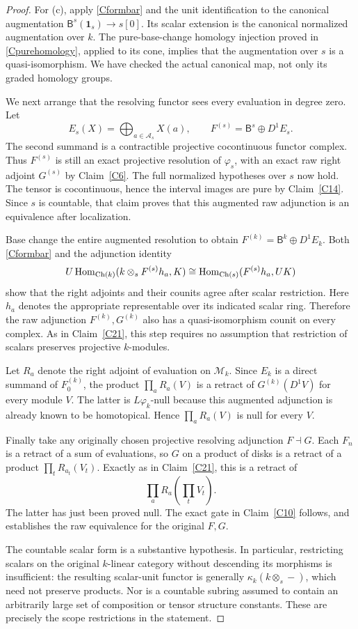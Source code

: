 \begin{proof}
For (c), apply \eqref{Cformbar} and the unit identification to the canonical augmentation $\mathsf B^s(\mathbf1_s)\to s[0]$. Its scalar extension is the canonical normalized augmentation over $k$. The pure-base-change homology injection proved in \eqref{Cpurehomology}, applied to its cone, implies that the augmentation over $s$ is a quasi-isomorphism. We have checked the actual canonical map, not only its graded homology groups.

We next arrange that the resolving functor sees every evaluation in degree zero. Let
\[
 E_s(X)=\bigoplus_{a\in\mathcal A_s}X(a),
 \qquad
 F^{(s)}=\mathsf B^s\oplus D^1E_s.
\]
The second summand is a contractible projective cocontinuous functor complex. Thus $F^{(s)}$ is still an exact projective resolution of $\varphi_s$, with an exact raw right adjoint $G^{(s)}$ by Claim~\ref{C6}. The full normalized hypotheses over $s$ now hold. The tensor is cocontinuous, hence the interval images are pure by Claim~\ref{C14}. Since $s$ is countable, that claim proves that this augmented raw adjunction is an equivalence after localization.

Base change the entire augmented resolution to obtain $F^{(k)}=\mathsf B^k\oplus D^1E_k$. Both \eqref{Cformbar} and the adjunction identity
\[
 U\operatorname{Hom}_{\operatorname{Ch}(k)}
      (k\otimes_s F^{(s)}h_a,K)
 \cong
 \operatorname{Hom}_{\operatorname{Ch}(s)}(F^{(s)}h_a,UK)
\]
show that the right adjoints and their counits agree after scalar restriction. Here $h_a$ denotes the appropriate representable over its indicated scalar ring. Therefore the raw adjunction $F^{(k)},G^{(k)}$ also has a quasi-isomorphism counit on every complex. As in Claim~\ref{C21}, this step requires no assumption that restriction of scalars preserves projective $k$-modules.

Let $R_a$ denote the right adjoint of evaluation on $\mathcal M_k$. Since $E_k$ is a direct summand of $F^{(k)}_0$, the product $\prod_aR_a(V)$ is a retract of $G^{(k)}(D^1V)$ for every module $V$. The latter is $L\varphi_k$-null because this augmented adjunction is already known to be homotopical. Hence $\prod_aR_a(V)$ is null for every $V$.

Finally take any originally chosen projective resolving adjunction $F\dashv G$. Each $F_n$ is a retract of a sum of evaluations, so $G$ on a product of disks is a retract of a product $\prod_tR_{a_t}(V_t)$. Exactly as in Claim~\ref{C21}, this is a retract of
\[
 \prod_a R_a\!\left(\prod_tV_t\right).
\]
The latter has just been proved null. The exact gate in Claim~\ref{C10} follows, and establishes the raw equivalence for the original $F,G$.

The countable scalar form is a substantive hypothesis. In particular, restricting scalars on the original $k$-linear category without descending its morphisms is insufficient: the resulting scalar-unit functor is generally $\kappa_k(k\otimes_s-)$, which need not preserve products. Nor is a countable subring assumed to contain an arbitrarily large set of composition or tensor structure constants. These are precisely the scope restrictions in the statement.
\end{proof}


